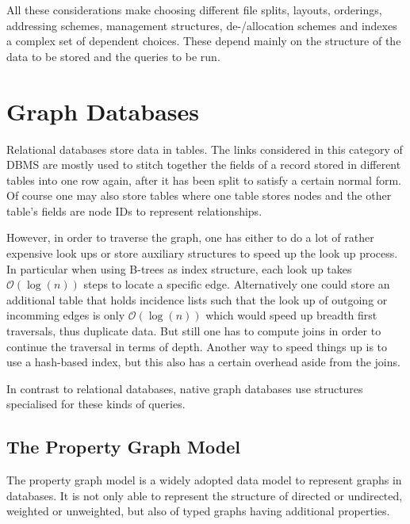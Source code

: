     All these considerations make choosing different file splits, layouts, orderings, addressing schemes, management structures, de-/allocation schemes and indexes a complex set of dependent choices. 
    These depend mainly on the structure of the data to be stored and the queries to be run.
            
\section{Graph Databases}
    Relational databases store data in tables.
    The links considered in this category of DBMS are mostly used to stitch together the fields of a record stored in different tables into one row again, after it has been split to satisfy a certain normal form.
    Of course one may also store tables where one table stores nodes and the other table's fields are node IDs to represent relationships.

    However, in order to traverse the graph, one has either to do a lot of rather expensive look ups or store auxiliary structures to speed up the look up process.
    In particular when using B-trees as index structure, each look up takes $\mathcal{O}(\log(n))$ steps to locate a specific edge.
    Alternatively one could store an additional table that holds incidence lists such that the look up of outgoing or incomming edges is only $\mathcal{O}(\log(n))$ which would speed up breadth first traversals, thus duplicate data.
    But still one has to compute joins in order to continue the traversal in terms of depth.
    Another way to speed things up is to use a hash-based index, but this also has a certain overhead aside from the joins.
    
    In contrast to relational databases, native graph databases use structures specialised for these kinds of queries.
            
    \subsection*{The Property Graph Model}\label{prop-graph-model}
        The property graph model is a widely adopted data model to represent graphs in databases.
        It is not only able to represent the structure of directed or undirected, weighted or unweighted, but also of typed graphs having additional properties.

